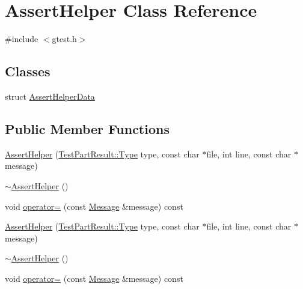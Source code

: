 \hypertarget{classtesting_1_1internal_1_1AssertHelper}{\section{\-Assert\-Helper \-Class \-Reference}
\label{d7/d85/classtesting_1_1internal_1_1AssertHelper}
}


{\ttfamily \#include $<$gtest.\-h$>$}

\subsection*{\-Classes}
\begin{DoxyCompactItemize}
\item 
struct \hyperlink{structtesting_1_1internal_1_1AssertHelper_1_1AssertHelperData}{\-Assert\-Helper\-Data}
\end{DoxyCompactItemize}
\subsection*{\-Public \-Member \-Functions}
\begin{DoxyCompactItemize}
\item 
\hyperlink{classtesting_1_1internal_1_1AssertHelper_ad2f02ef373bd4828ea059b997adf2ded}{\-Assert\-Helper} (\hyperlink{classtesting_1_1TestPartResult_a1d1cfd8ffb84e947f82999c682b666a7}{\-Test\-Part\-Result\-::\-Type} type, const char $\ast$file, int line, const char $\ast$message)
\item 
\hyperlink{classtesting_1_1internal_1_1AssertHelper_a8b4957313ec967080674296be5b6e1bc}{$\sim$\-Assert\-Helper} ()
\item 
void \hyperlink{classtesting_1_1internal_1_1AssertHelper_ad4e11743a05a2239e6e73b711c89e6d3}{operator=} (const \hyperlink{classtesting_1_1Message}{\-Message} \&message) const 
\item 
\hyperlink{classtesting_1_1internal_1_1AssertHelper_ad2f02ef373bd4828ea059b997adf2ded}{\-Assert\-Helper} (\hyperlink{classtesting_1_1TestPartResult_a1d1cfd8ffb84e947f82999c682b666a7}{\-Test\-Part\-Result\-::\-Type} type, const char $\ast$file, int line, const char $\ast$message)
\item 
\hyperlink{classtesting_1_1internal_1_1AssertHelper_a8b4957313ec967080674296be5b6e1bc}{$\sim$\-Assert\-Helper} ()
\item 
void \hyperlink{classtesting_1_1internal_1_1AssertHelper_ad4e11743a05a2239e6e73b711c89e6d3}{operator=} (const \hyperlink{classtesting_1_1Message}{\-Message} \&message) const 
\end{DoxyCompactItemize}
